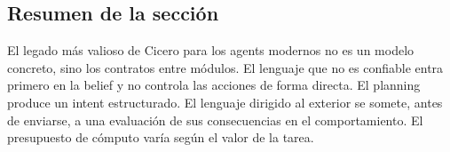 \subsection{Resumen de la sección}

El legado más valioso de Cicero para los agents modernos no es un modelo concreto, sino los contratos entre módulos. El lenguaje que no es confiable entra primero en la belief y no controla las acciones de forma directa. El planning produce un intent estructurado. El lenguaje dirigido al exterior se somete, antes de enviarse, a una evaluación de sus consecuencias en el comportamiento. El presupuesto de cómputo varía según el valor de la tarea.
